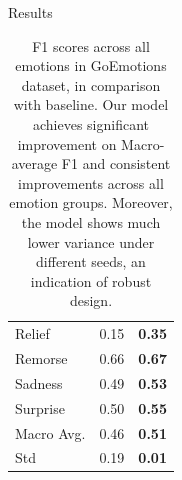 \documentclass[final,20pt]{beamer}
\newlength{\onecolwid}
\begin{document}
\begin{frame}[t]
\begin{columns}[t]
\begin{column}{\onecolwid}
\begin{block}{Results}
\begin{table}[]
\begin{center}
\begin{tabular}{|p{10cm}|p{10cm}|p{10cm}|}
        Relief & 0.15 & \textbf{0.35} \\
        Remorse & 0.66 & \textbf{0.67} \\
        Sadness & 0.49 & \textbf{0.53} \\
        Surprise & 0.50 & \textbf{0.55}\\
        \hline
        Macro Avg. & 0.46 & \textbf{0.51}\\
        \hline
        Std & 0.19 & \textbf{0.01} \\
        \hline
    \end{tabular}
    \end{center}
    \caption{F1 scores across all emotions in GoEmotions dataset, in comparison with baseline. Our model achieves significant improvement on Macro-average F1 and consistent improvements across all emotion groups. Moreover, the model shows much lower variance under different seeds, an indication of robust design.}
    \label{tab:my_label}
\end{table} 








\end{block}

\end{column} %



\end{columns} %

\end{frame} %
\end{document}
